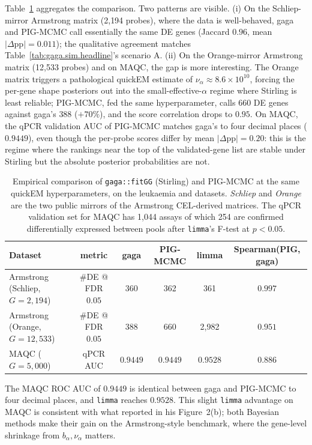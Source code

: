 Table~\ref{tab:gaga.empirical} aggregates the comparison. Two
patterns are visible. (i) On the Schliep-mirror Armstrong matrix
(2{,}194 probes), where the data is well-behaved, gaga and
PIG-MCMC call essentially the same DE genes (Jaccard $0.96$,
mean $|\Delta\mathrm{pp}| = 0.011$); the qualitative agreement
matches Table~\ref{tab:gaga.sim.headline}'s scenario A. (ii) On the
Orange-mirror Armstrong matrix (12{,}533 probes) and on MAQC, the
gap is more interesting. The Orange matrix triggers a pathological
quickEM estimate of $\nu_\alpha \approx 8.6\!\times\!10^{10}$,
forcing the per-gene shape posteriors out into the small-effective-$\alpha$
regime where Stirling is least reliable; PIG-MCMC, fed the same
hyperparameter, calls $660$ DE genes against gaga's $388$ ($+70\%$),
and the score correlation drops to $0.95$. On MAQC, the qPCR
validation AUC of PIG-MCMC matches gaga's to four decimal places
($0.9449$), even though the per-probe scores differ by mean
$|\Delta\mathrm{pp}| = 0.20$: this is the regime where the rankings
near the top of the validated-gene list are stable under
Stirling but the absolute posterior probabilities are not.

\begin{table}[t]
\centering
\caption{Empirical comparison of \texttt{gaga::fitGG} (Stirling) and
PIG-MCMC at the same quickEM hyperparameters, on the
\citet{Armstrong2002} leukaemia and \citet{MAQC2006} datasets.
\textit{Schliep} and \textit{Orange} are the two public mirrors of the
Armstrong CEL-derived matrices. The qPCR validation set for MAQC has
1{,}044 assays of which 254 are confirmed differentially expressed
between pools after \texttt{limma}'s F-test at $p < 0.05$.}
\label{tab:gaga.empirical}
\smallskip
\renewcommand{\arraystretch}{1.05}
\setlength{\tabcolsep}{4pt}
{\footnotesize
\begin{tabular}{@{}lccccc@{}}
\toprule
Dataset & metric & gaga & PIG-MCMC & limma & Spearman(PIG, gaga) \\
\midrule
Armstrong (Schliep, $G=2{,}194$) & \#DE @ FDR $0.05$ & 360 & 362 & 361 & $0.997$ \\
Armstrong (Orange, $G=12{,}533$) & \#DE @ FDR $0.05$ & 388 & 660 & 2{,}982 & $0.951$ \\
MAQC ($G=5{,}000$) & qPCR AUC & $0.9449$ & $0.9449$ & $0.9528$ & $0.886$ \\
\bottomrule
\end{tabular}}
\end{table}

The MAQC ROC AUC of $0.9449$ is identical between gaga and PIG-MCMC
to four decimal places, and \texttt{limma} reaches $0.9528$. This
slight \texttt{limma} advantage on MAQC is consistent with what
\citet{Rossell2009GaGa} reported in his Figure~2(b); both Bayesian
methods make their gain on the Armstrong-style benchmark, where the
gene-level shrinkage from $b_\alpha, \nu_\alpha$ matters.

